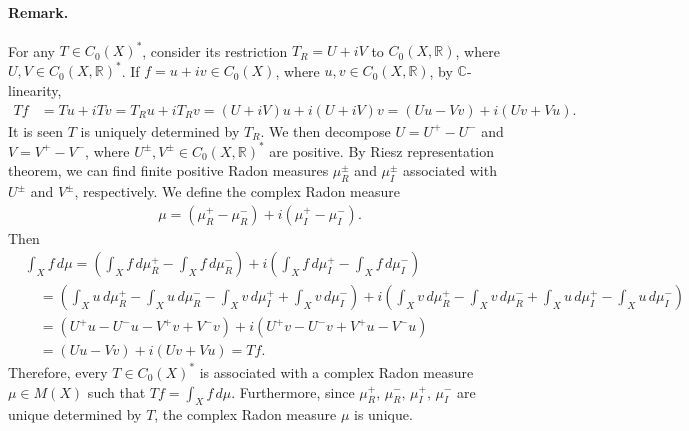 \documentclass{article}
\numberwithin{equation}{section}
\newcommand{\bbC}{\mathbb{C}}
\newcommand{\bbR}{\mathbb{R}}
\theoremstyle{plain}
\theoremstyle{definition}
\begin{document}
\paragraph{Remark.} For any $T\in C_0(X)^*$, consider its restriction $T_R=U+iV$ to $C_0(X,\bbR)$, where $U,V\in C_0(X,\bbR)^*$. If $f=u+iv\in C_0(X)$, where $u,v\in C_0(X,\bbR)$, by $\bbC$-linearity,
\begin{align*}
	Tf &= Tu+iTv= T_R u+iT_R v=(U+iV)u+i(U+iV)v=(Uu-Vv)+i(Uv+Vu).
\end{align*}
It is seen $T$ is uniquely determined by $T_R$. We then decompose $U=U^+-U^-$ and $V=V^+-V^-$, where $U^\pm,V^\pm\in C_0(X,\bbR)^*$ are positive. By Riesz representation theorem, we can find finite positive Radon measures $\mu_R^{\pm}$ and $\mu_I^{\pm}$ associated with $U^\pm$ and $V^\pm$, respectively. We define the complex Radon measure
\begin{align*}
	\mu=\left(\mu_R^+-\mu_R^-\right)+i\left(\mu_I^+-\mu_I^-\right).
\end{align*}
Then
\begin{align*}
	&\int_X f\,d\mu=\left(\int_X f\,d\mu_R^+-\int_X f\,d\mu_R^-\right)+i\left(\int_X f\,d\mu_I^+-\int_X f\,d\mu_I^-\right)\\
	&\quad=\left(\int_X u\,d\mu_R^+-\int_X u\,d\mu_R^--\int_X v\,d\mu_I^++\int_X v\,d\mu_I^-\right)+i\left(\int_X v\,d\mu_R^+-\int_X v\,d\mu_R^-+\int_X u\,d\mu_I^+-\int_X u\,d\mu_I^-\right)\\
	&\quad=\left(U^+ u-U^-u-V^+v+V^-v\right)+i\left(U^+v-U^-v+V^+u-V^-u\right)\\
	&\quad =(Uu-Vv)+i(Uv+Vu)=Tf.
\end{align*}
Therefore, every $T\in C_0(X)^*$ is associated with a complex Radon measure $\mu\in M(X)$ such that $Tf=\int_X f\,d\mu$. Furthermore, since $\mu_R^+,\, \mu_R^-,\,\mu_I^+,\,\mu_I^-$ are unique determined by $T$, the complex Radon measure $\mu$ is unique.
\end{document}
